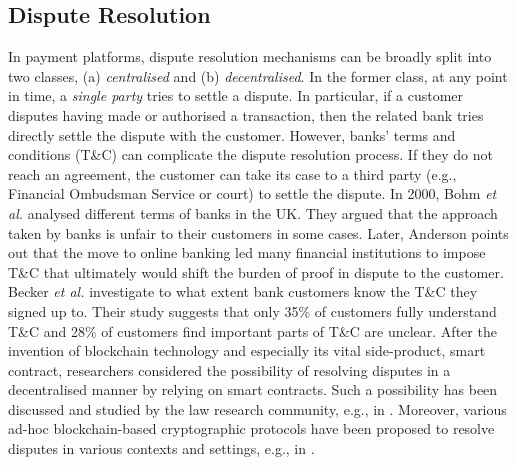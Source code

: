 \subsection{Dispute Resolution}
 \vspace{-1mm}
In payment platforms,  dispute resolution mechanisms can be broadly split into two classes, (a) \emph{centralised} and (b) \emph{decentralised}. In the former class,  at any point in time, a \emph{single party} tries to settle a dispute. In particular, if a customer  disputes having made or authorised a transaction, then the related bank tries directly settle the dispute with the customer.  However,  banks' terms and conditions (T\&C) can complicate the dispute resolution process. If they do not reach an agreement, the customer can take its case to a third party (e.g., Financial Ombudsman Service or court) to settle the dispute. In 2000, Bohm \textit{et al.} \cite{BohmBG00} analysed different terms of banks in the UK. They argued that the approach taken by banks is unfair to their customers in some cases. Later,  Anderson  \cite{anderson2007closing} points out that the move to online banking led many financial institutions to impose T\&C  that ultimately would shift the burden of proof in dispute to the customer.    Becker \textit{et al.} \cite{BeckerHAABMSS17} investigate to what extent bank customers know the  T\&C they  signed up to. Their study suggests that only 35\% of customers fully understand T\&C and  28\% of customers find important parts of T\&C are unclear.  After the invention of  blockchain technology and  especially its vital side-product, smart contract, researchers considered  the possibility of resolving disputes in a decentralised manner by relying on smart contracts. Such a possibility has been discussed and studied by the law research community, e.g., in \cite{buchwald2019smart,ortolani2016self,ortolani2019impact}. Moreover,  various ad-hoc blockchain-based cryptographic protocols have been  proposed to resolve disputes in various contexts and settings, e.g., in \cite{DziembowskiEF18,EckeyFS20,Lightning-Network,Bolt,cryptoeprint:2021:1145}. 



